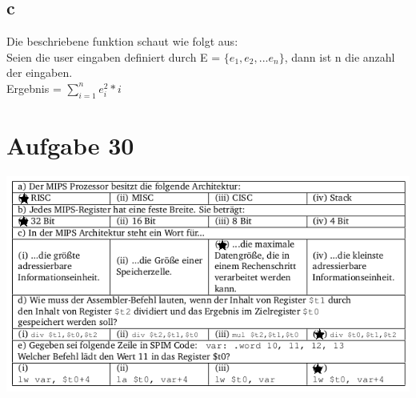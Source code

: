 \documentclass[10pt,a4paper]{article}
\begin{document}
\subsection{c}
Die beschriebene funktion schaut wie folgt aus:\\
Seien die user eingaben definiert durch E = $\{e_1, e_2, ... e_n\}$, dann ist n die anzahl der eingaben.\\
Ergebnis = $ \sum_{i = 1}^n e_i^2 * i $

\newpage
\section{Aufgabe 30}
\includegraphics[scale=0.5]{A30.png} 
\end{document}
